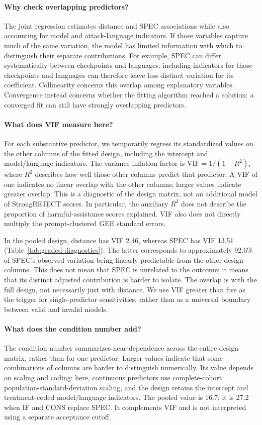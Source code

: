 \paragraph*{Why check overlapping predictors?} The joint regression estimates distance and SPEC associations while also accounting for model and attack-language indicators. If those variables capture much of the same variation, the model has limited information with which to distinguish their separate contributions. For example, SPEC can differ systematically between checkpoints and languages; including indicators for those checkpoints and languages can therefore leave less distinct variation for its coefficient. Collinearity concerns this overlap among explanatory variables. Convergence instead concerns whether the fitting algorithm reached a solution: a converged fit can still have strongly overlapping predictors.

\paragraph*{What does VIF measure here?} For each substantive predictor, we temporarily regress its standardized values on the other columns of the fitted design, including the intercept and model/language indicators. The variance inflation factor is $\mathrm{VIF}=1/(1-R^2)$, where $R^2$ describes how well those other columns predict that predictor. A VIF of one indicates no linear overlap with the other columns; larger values indicate greater overlap. This is a diagnostic of the design matrix, not an additional model of StrongREJECT scores. In particular, the auxiliary $R^2$ does not describe the proportion of harmful-assistance scores explained. VIF also does not directly multiply the prompt-clustered GEE standard errors.

In the pooled design, distance has VIF 2.46, whereas SPEC has VIF 13.51 (Table~\ref{tab:graded-diagnostics}). The latter corresponds to approximately 92.6\% of SPEC's observed variation being linearly predictable from the other design columns. This does not mean that SPEC is unrelated to the outcome; it means that its distinct adjusted contribution is harder to isolate. The overlap is with the full design, not necessarily just with distance. We use VIF greater than five as the trigger for single-predictor sensitivities, rather than as a universal boundary between valid and invalid models.

\paragraph*{What does the condition number add?} The condition number summarizes near-dependence across the entire design matrix, rather than for one predictor. Larger values indicate that some combinations of columns are harder to distinguish numerically. Its value depends on scaling and coding: here, continuous predictors use complete-cohort population-standard-deviation scaling, and the design retains the intercept and treatment-coded model/language indicators. The pooled value is 16.7; it is 27.2 when IF and CONS replace SPEC. It complements VIF and is not interpreted using a separate acceptance cutoff.
